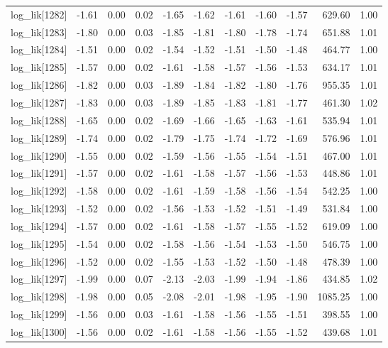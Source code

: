 \begin{table}[ht]
\begin{tabular}{rrrrrrrrrrr}
  log\_lik[1282] & -1.61 & 0.00 & 0.02 & -1.65 & -1.62 & -1.61 & -1.60 & -1.57 & 629.60 & 1.00 \\ 
  log\_lik[1283] & -1.80 & 0.00 & 0.03 & -1.85 & -1.81 & -1.80 & -1.78 & -1.74 & 651.88 & 1.01 \\ 
  log\_lik[1284] & -1.51 & 0.00 & 0.02 & -1.54 & -1.52 & -1.51 & -1.50 & -1.48 & 464.77 & 1.00 \\ 
  log\_lik[1285] & -1.57 & 0.00 & 0.02 & -1.61 & -1.58 & -1.57 & -1.56 & -1.53 & 634.17 & 1.01 \\ 
  log\_lik[1286] & -1.82 & 0.00 & 0.03 & -1.89 & -1.84 & -1.82 & -1.80 & -1.76 & 955.35 & 1.01 \\ 
  log\_lik[1287] & -1.83 & 0.00 & 0.03 & -1.89 & -1.85 & -1.83 & -1.81 & -1.77 & 461.30 & 1.02 \\ 
  log\_lik[1288] & -1.65 & 0.00 & 0.02 & -1.69 & -1.66 & -1.65 & -1.63 & -1.61 & 535.94 & 1.01 \\ 
  log\_lik[1289] & -1.74 & 0.00 & 0.02 & -1.79 & -1.75 & -1.74 & -1.72 & -1.69 & 576.96 & 1.01 \\ 
  log\_lik[1290] & -1.55 & 0.00 & 0.02 & -1.59 & -1.56 & -1.55 & -1.54 & -1.51 & 467.00 & 1.01 \\ 
  log\_lik[1291] & -1.57 & 0.00 & 0.02 & -1.61 & -1.58 & -1.57 & -1.56 & -1.53 & 448.86 & 1.01 \\ 
  log\_lik[1292] & -1.58 & 0.00 & 0.02 & -1.61 & -1.59 & -1.58 & -1.56 & -1.54 & 542.25 & 1.00 \\ 
  log\_lik[1293] & -1.52 & 0.00 & 0.02 & -1.56 & -1.53 & -1.52 & -1.51 & -1.49 & 531.84 & 1.00 \\ 
  log\_lik[1294] & -1.57 & 0.00 & 0.02 & -1.61 & -1.58 & -1.57 & -1.55 & -1.52 & 619.09 & 1.00 \\ 
  log\_lik[1295] & -1.54 & 0.00 & 0.02 & -1.58 & -1.56 & -1.54 & -1.53 & -1.50 & 546.75 & 1.00 \\ 
  log\_lik[1296] & -1.52 & 0.00 & 0.02 & -1.55 & -1.53 & -1.52 & -1.50 & -1.48 & 478.39 & 1.00 \\ 
  log\_lik[1297] & -1.99 & 0.00 & 0.07 & -2.13 & -2.03 & -1.99 & -1.94 & -1.86 & 434.85 & 1.02 \\ 
  log\_lik[1298] & -1.98 & 0.00 & 0.05 & -2.08 & -2.01 & -1.98 & -1.95 & -1.90 & 1085.25 & 1.00 \\ 
  log\_lik[1299] & -1.56 & 0.00 & 0.03 & -1.61 & -1.58 & -1.56 & -1.55 & -1.51 & 398.55 & 1.00 \\ 
  log\_lik[1300] & -1.56 & 0.00 & 0.02 & -1.61 & -1.58 & -1.56 & -1.55 & -1.52 & 439.68 & 1.01 \\ 

\end{tabular}
\end{table}
